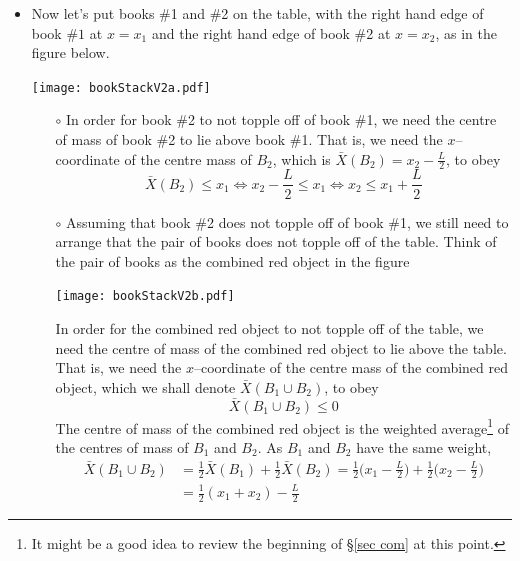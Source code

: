 \begin{itemize}
\item
Now let's put books \#1 and \#2 on the table, with the right hand edge of
book \#$1$ at $x=x_1$ and the right hand edge of book \#2 at
$x=x_2$, as in the figure below.
\begin{efig}
\begin{center}
     \texttt{[image: bookStackV2a.pdf]}
\end{center}
\end{efig}

\begin{itemize}\itemsep1pt \parskip0pt  \itemindent-10pt
\item[$\circ$]
In order for book \#2 to not topple off of book \#1, we need the
centre of mass of book \#2 to lie above book \#1. That is, we need
the $x$--coordinate of the centre mass of $B_2$, which is
$\bar X(B_2)=x_2-\frac{L}{2}$, to obey
\begin{equation*}
\bar X(B_2) \le x_1
\iff
x_2-\frac{L}{2} \le x_1
\iff
x_2\le x_1+\frac{L}{2}
\end{equation*}
\item[$\circ$]
Assuming that book \#2 does not topple off of book \#1, we still
need to arrange that the pair of books does not topple off of the table.
Think of the pair of books as the combined red object in the figure
\begin{efig}
\begin{center}
     \texttt{[image: bookStackV2b.pdf]}
\end{center}
\end{efig}
In order for the combined red object to not topple off of the table,
we need the centre of mass of the combined red object to lie above
the table. That is, we need the $x$--coordinate
of the centre mass of the combined red object, which we shall denote
$\bar X(B_1\cup B_2)$, to obey
\begin{equation*}
\bar X(B_1\cup B_2) \le 0
\end{equation*}
The centre of mass of the combined red object is the weighted
average\footnote{It might be a good idea to review the beginning of
\S\ref{sec com} at this point.} of the centres of mass of $B_1$ and $B_2$.
As $B_1$ and $B_2$ have the same weight,
\begin{align*}
\bar X(B_1\cup B_2) &= \frac{1}{2}\bar X(B_1) +\frac{1}{2}\bar X(B_2)
    = \frac{1}{2}\Big(x_1-\frac{L}{2}\Big) +\frac{1}{2}\Big(x_2-\frac{L}{2}\Big)
\\
&= \frac{1}{2}(x_1+x_2) -\frac{L}{2}
\end{align*}

\end{itemize}
\end{itemize}
